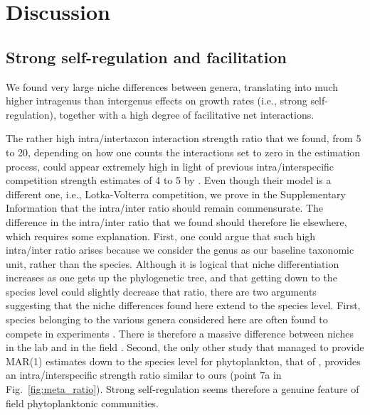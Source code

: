 \documentclass[10pt]{article}
\begin{document}
\section*{Discussion}

\subsection*{Strong self-regulation and facilitation}

We found very large niche differences between genera, translating
into much higher intragenus than intergenus effects on growth rates
(i.e., strong self-regulation), together with a high degree of facilitative
net interactions.

The rather high intra/intertaxon interaction strength ratio \citep{levine_importance_2009}
that we found, from 5 to 20, depending on how one counts the interactions
set to zero in the estimation process, could appear extremely high
in light of previous intra/interspecific competition strength estimates
of 4 to 5 by \citet{adler_competition_2018}. Even
though their model is a different one, i.e., Lotka-Volterra competition,
we prove in the Supplementary Information that the intra/inter ratio
should remain commensurate. The difference in the intra/inter ratio
that we found should therefore lie elsewhere, which requires some
explanation. First, one could argue that such high intra/inter ratio
arises because we consider the genus as our baseline taxonomic unit,
rather than the species. Although it is logical that niche differentiation
increases as one gets up the phylogenetic tree, and that getting down
to the species level could slightly decrease that ratio, there are
two arguments suggesting that the niche differences found here extend
to the species level. First, species belonging to the various genera
considered here are often found to compete in experiments \citep{titman_ecological_1976,tilman_phytoplankton_1982,descamps-julien_stable_2005}.
There is therefore a massive difference between niches in the lab
and in the field \citep{barraquand_coastal_2018}. Second, the
only other study that managed to provide MAR(1) estimates down to
the species level for phytoplankton, that of \citet{huber_role_2006},
provides an intra/interspecific strength ratio similar to ours (point
7a in Fig.~\ref{fig:meta_ratio}). Strong self-regulation seems therefore
a genuine feature of field phytoplanktonic communities.
\end{document}
